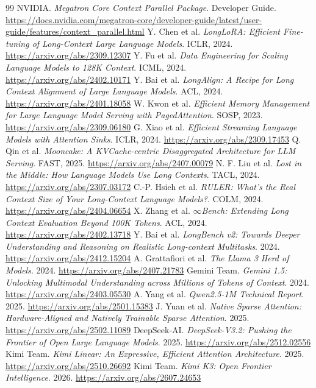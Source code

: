 \documentclass[UTF8,10pt,a4paper,fontset=none]{ctexart}
\begin{document}
\begin{thebibliography}{99}
 NVIDIA. \textit{Megatron Core Context Parallel Package}. Developer Guide. \url{https://docs.nvidia.com/megatron-core/developer-guide/latest/user-guide/features/context_parallel.html}
 Y. Chen et al. \textit{LongLoRA: Efficient Fine-tuning of Long-Context Large Language Models}. ICLR, 2024. \url{https://arxiv.org/abs/2309.12307}
 Y. Fu et al. \textit{Data Engineering for Scaling Language Models to 128K Context}. ICML, 2024. \url{https://arxiv.org/abs/2402.10171}
 Y. Bai et al. \textit{LongAlign: A Recipe for Long Context Alignment of Large Language Models}. ACL, 2024. \url{https://arxiv.org/abs/2401.18058}
 W. Kwon et al. \textit{Efficient Memory Management for Large Language Model Serving with PagedAttention}. SOSP, 2023. \url{https://arxiv.org/abs/2309.06180}
 G. Xiao et al. \textit{Efficient Streaming Language Models with Attention Sinks}. ICLR, 2024. \url{https://arxiv.org/abs/2309.17453}
 Q. Qin et al. \textit{Mooncake: A KVCache-centric Disaggregated Architecture for LLM Serving}. FAST, 2025. \url{https://arxiv.org/abs/2407.00079}
 N. F. Liu et al. \textit{Lost in the Middle: How Language Models Use Long Contexts}. TACL, 2024. \url{https://arxiv.org/abs/2307.03172}
 C.-P. Hsieh et al. \textit{RULER: What's the Real Context Size of Your Long-Context Language Models?}. COLM, 2024. \url{https://arxiv.org/abs/2404.06654}
 X. Zhang et al. \textit{$\infty$Bench: Extending Long Context Evaluation Beyond 100K Tokens}. ACL, 2024. \url{https://arxiv.org/abs/2402.13718}
 Y. Bai et al. \textit{LongBench v2: Towards Deeper Understanding and Reasoning on Realistic Long-context Multitasks}. 2024. \url{https://arxiv.org/abs/2412.15204}
 A. Grattafiori et al. \textit{The Llama 3 Herd of Models}. 2024. \url{https://arxiv.org/abs/2407.21783}
 Gemini Team. \textit{Gemini 1.5: Unlocking Multimodal Understanding across Millions of Tokens of Context}. 2024. \url{https://arxiv.org/abs/2403.05530}
 A. Yang et al. \textit{Qwen2.5-1M Technical Report}. 2025. \url{https://arxiv.org/abs/2501.15383}
 J. Yuan et al. \textit{Native Sparse Attention: Hardware-Aligned and Natively Trainable Sparse Attention}. 2025. \url{https://arxiv.org/abs/2502.11089}
 DeepSeek-AI. \textit{DeepSeek-V3.2: Pushing the Frontier of Open Large Language Models}. 2025. \url{https://arxiv.org/abs/2512.02556}
 Kimi Team. \textit{Kimi Linear: An Expressive, Efficient Attention Architecture}. 2025. \url{https://arxiv.org/abs/2510.26692}
 Kimi Team. \textit{Kimi K3: Open Frontier Intelligence}. 2026. \url{https://arxiv.org/abs/2607.24653}
\end{thebibliography}
\end{document}
